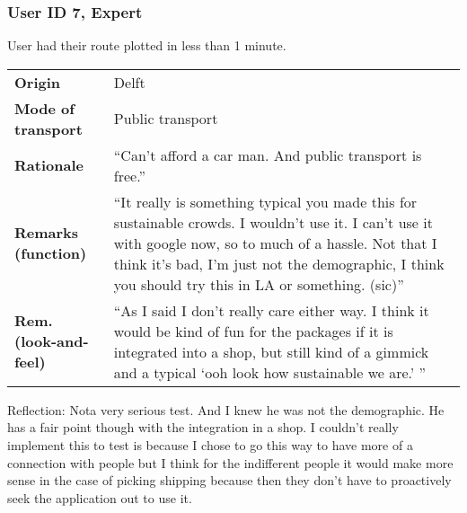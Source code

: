 \documentclass[final,a4paper,11pt]{article}
\newlength{\resulttablecolone}
\newlength{\resulttablecoltwo}
\begin{document}
\subsubsection*{User ID 7, Expert}
User had their route plotted in less than 1 minute.
\begin{table}[H]
\begin{tabular}{p{\resulttablecolone}|p{\resulttablecoltwo}}
\textbf{Origin} & Delft \\
\textbf{Mode of transport} & Public transport \\
\textbf{Rationale} & ``Can't afford a car man. And public transport is free.'' \\
\textbf{Remarks (function)} & ``It really is something typical you made this for sustainable crowds. I wouldn't use it. I can't use it with google now, so to much of a hassle. Not that I think it's bad, I'm just not the demographic, I think you should try this in LA or something. (sic)'' \\
\textbf{Rem. (look-and-feel)} & ``As I said I don't really care either way. I think it would be kind of fun for the packages if it is integrated into a shop, but still kind of a gimmick and a typical `ooh look how sustainable we are.' '' \\
\end{tabular}
\end{table}
Reflection: Nota very serious test. And I knew he was not the demographic. He has a fair point though with the integration in a shop. I couldn't really implement this to test is because I chose to go this way to have more of a connection with people but I think for the indifferent people it would make more sense in the case of picking shipping because then they don't have to proactively seek the application out to use it.
\end{document}
